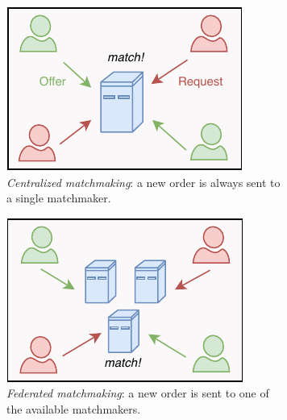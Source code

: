 \begin{figure}[t]
	\centering
	\begin{subfigure}[t]{.33\textwidth}
		\centering
		\captionsetup{width=.9\linewidth}
		\includegraphics[width=.9\linewidth]{introduction/assets/centralized_matchmaking}
		\caption{\emph{Centralized matchmaking}: a new order is always sent to a single matchmaker.}
		\label{fig:centralized_matchmaking}
	\end{subfigure}%
	\begin{subfigure}[t]{.33\textwidth}
		\centering
		\captionsetup{width=.9\linewidth}
		\includegraphics[width=.9\linewidth]{introduction/assets/federated_matchmaking}
		\caption{\emph{Federated matchmaking}: a new order is sent to one of the available matchmakers.}
		\label{fig:federated_matchmaking}
	\end{subfigure}%
	\begin{subfigure}[t]{.33\textwidth}
		\centering
		\captionsetup{width=.9\linewidth}

\end{subfigure}
\end{figure}
